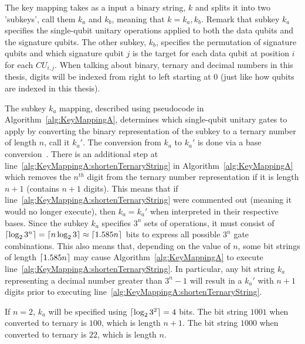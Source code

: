 The key mapping takes as a input a binary string, $k$ and splits it into two 'subkeys', call them $k_a$ and $k_b$, meaning that $k = k_a,k_b$. Remark that subkey $k_a$ specifies the single-qubit unitary operations applied to both the data qubits and the signature qubits. The other subkey, $k_b$, specifies the permutation of signature qubits and which signature qubit $j$ is the target for each data qubit at position $i$ for each $\mathit{CU}_{i,j}$. When talking about binary, ternary and decimal numbers in this thesis, digits will be indexed from right to left starting at $0$ (just like how qubits are indexed in this thesis).

The subkey $k_a$ mapping, described using pseudocode in Algorithm~\ref{alg:KeyMappingA}, determines which single-qubit unitary gates to apply by converting the binary representation of the subkey to a ternary number of length $n$, call it $k_a'$. The conversion from $k_a$ to $k_a'$ is done via a base conversion~\cite{BaseConversionWikipedia}. There is an additional step at line~\ref{alg:KeyMappingA:shortenTernaryString} in Algorithm~\ref{alg:KeyMappingA} which removes the $n^{th}$ digit from the ternary number representation if it is length $n+1$ (contains $n+1$ digits). This means that if line~\ref{alg:KeyMappingA:shortenTernaryString} were commented out (meaning it would no longer execute), then $k_a = k_a'$ when interpreted in their respective bases. Since the subkey $k_a$ specifies $3^n$ sets of operations, it must consist of $\lceil\log_2 3^n\rceil = \lceil n \log_2 3\rceil \approx \lceil1.585 n\rceil$ bits to express all possible $3^n$ gate combinations. This also means that, depending on the value of $n$, some bit strings of length $\lceil1.585 n\rceil$ may cause Algorithm~\ref{alg:KeyMappingA} to execute line~\ref{alg:KeyMappingA:shortenTernaryString}. In particular, any bit string $k_a$ representing a decimal number greater than $3^n - 1$ will result in a $k_a'$ with $n+1$ digits prior to executing line~\ref{alg:KeyMappingA:shortenTernaryString}.

\begin{example}
If $n = 2$, $k_a$ will be specified using $\lceil\log_2 3^2\rceil = 4$ bits. The bit string $1001$ when converted to ternary is $100$, which is length $n+1$. The bit string $1000$ when converted to ternary is $22$, which is length $n$.
\end{example}

